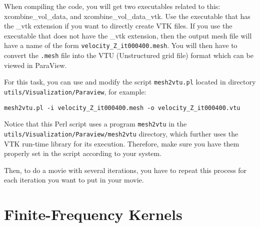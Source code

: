 When compiling the code, you will get two executables related to this: xcombine\_vol\_data, and xcombine\_vol\_data\_vtk.
Use the executable that has the \_vtk extension if you want to directly create VTK files.
If you use the executable that does not have the \_vtk extension, then the output mesh file will have a name of the form \texttt{velocity\_Z\_it000400.mesh}.
You will then have to convert the \texttt{.mesh} file into the VTU (Unstructured grid file) format which can be viewed in ParaView.\newline

\noindent
For this task, you can use and modify the
script \texttt{mesh2vtu.pl} located in directory \texttt{\small utils/Visualization/Paraview}, for example:

{\footnotesize
\begin{verbatim}
mesh2vtu.pl -i velocity_Z_it000400.mesh -o velocity_Z_it000400.vtu
\end{verbatim}
}

Notice that this Perl script uses a program \texttt{mesh2vtu} in the \texttt{utils/Visualization/Paraview/mesh2vtu} directory, which further
uses the VTK  run-time library for its execution. Therefore, make sure you have them properly set
in the script according to your system.\newline

\bigskip

Then, to do a movie with several iterations, you have to repeat this process for each iteration you want to put in your movie.

\section{Finite-Frequency Kernels}\label{sec:Finite-Frequency-Kernels}

